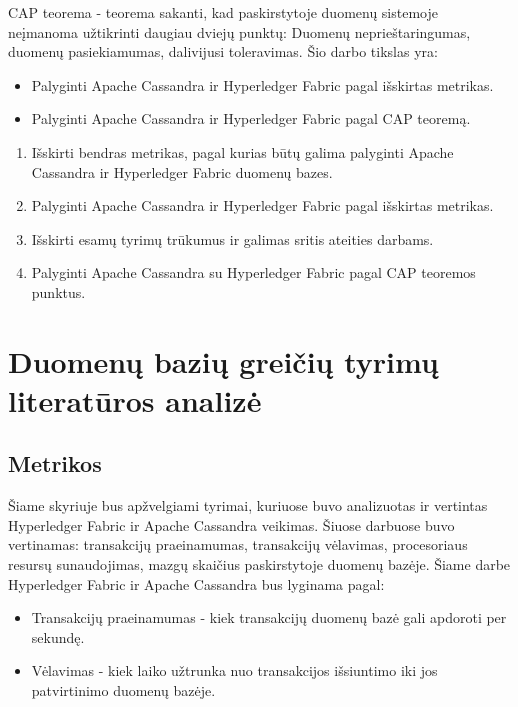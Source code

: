 \documentclass{VUMIFPSkursinis}
\begin{document}

CAP teorema - teorema sakanti, kad paskirstytoje duomenų sistemoje neįmanoma užtikrinti daugiau dviejų punktų: Duomenų neprieštaringumas, duomenų pasiekiamumas, dalivijusi toleravimas. \newline
Šio darbo tikslas yra:
\begin{itemize}
\item{Palyginti Apache Cassandra ir Hyperledger Fabric pagal išskirtas metrikas.}
\item{Palyginti Apache Cassandra ir Hyperledger Fabric pagal CAP teoremą.}
\end{itemize}

\thispagestyle{empty}
\begin{enumerate}
\item{Išskirti bendras metrikas, pagal kurias būtų galima palyginti Apache Cassandra ir Hyperledger Fabric duomenų bazes.}
\item{Palyginti Apache Cassandra ir Hyperledger Fabric pagal išskirtas metrikas.}
\item{Išskirti esamų tyrimų trūkumus ir galimas sritis ateities darbams.}
\item{Palyginti Apache Cassandra su Hyperledger Fabric pagal CAP teoremos punktus.}
\end{enumerate}
\pagebreak
\section{Duomenų bazių greičių tyrimų literatūros analizė}

\subsection{Metrikos}
Šiame skyriuje bus apžvelgiami tyrimai, kuriuose buvo analizuotas ir vertintas Hyperledger Fabric \cite{IMBResearch,ThailandPerf,ShaFabPerf} ir Apache Cassandra \cite{BITCass,MonCas} veikimas. 
Šiuose darbuose buvo vertinamas: transakcijų praeinamumas, transakcijų vėlavimas, procesoriaus resursų sunaudojimas, mazgų skaičius paskirstytoje duomenų bazėje. \newline
Šiame darbe Hyperledger Fabric ir Apache Cassandra bus lyginama pagal:
\begin{itemize}
\item{Transakcijų praeinamumas - kiek transakcijų duomenų bazė gali apdoroti per sekundę.}
\item{Vėlavimas - kiek laiko užtrunka nuo transakcijos išsiuntimo iki jos patvirtinimo duomenų bazėje.}
\end{itemize}
\end{document}
